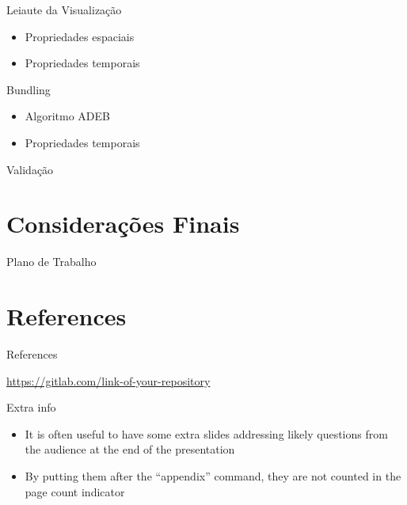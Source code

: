 \begin{frame}{Leiaute da Visualização}
  \begin{itemize}
    \item Propriedades espaciais
    \item Propriedades temporais
  \end{itemize}
\end{frame}

\begin{frame}{Bundling}
  \begin{itemize}
    \item Algoritmo ADEB
    \item Propriedades temporais
  \end{itemize}
\end{frame}

\begin{frame}{Validação}
\end{frame}

\section{Considerações Finais}

\begin{frame}{Plano de Trabalho}
\end{frame}

\section{References}

\begin{frame}[allowframebreaks]{References}
  \nocite{bronevetsky02, schmidt03:MSc, FSF:GNU-GPL, CORBA:spec, MenaChalco08, natbib, biblatex, eco:09}
  \printbibliography
\end{frame}

\begin{frame}{\insertshorttitle}
  \overview

  {%
    \centering\noindent%
    \url{https://gitlab.com/link-of-your-repository}\par
  }

\end{frame}

\showqrcode

\appendix

\begin{frame}{Extra info}
  \begin{itemize}
    \item It is often useful to have some extra slides addressing likely questions from the audience at the end of the presentation
    \item By putting them after the ``appendix'' command, they are not counted in the page count indicator
  \end{itemize}
\end{frame}
